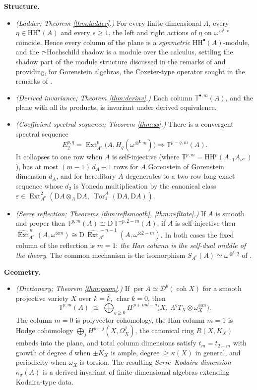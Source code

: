 \documentclass[11pt]{amsart}
\theoremstyle{definition}
\newcommand{\T}{\mathbb{T}}
\newcommand{\HH}{\mathrm{HH}}
\newcommand{\D}{\mathrm{D}}
\newcommand{\Ext}{\operatorname{Ext}}
\newcommand{\Tor}{\operatorname{Tor}}
\newcommand{\sExt}{\widehat{\operatorname{Ext}}}
\newcommand{\Ae}{A^{\mathrm{e}}}
\newcommand{\der}{\mathcal{D}}
\newcommand{\per}{\operatorname{per}}
\newcommand{\Lotimes}{\otimes^{\mathbf{L}}}
\newcommand{\kk}{k}
\begin{document}
\smallskip
\noindent\textbf{Structure.}
\begin{itemize}
\item[(A)] \emph{(Ladder; Theorem \ref{thm:ladder}.)} For every
finite-dimensional $A$, every $\eta\in\HH^\bullet(A)$ and every $s\ge1$, the
left and right actions of $\eta$ on $\omega^{\Lotimes s}$ coincide. Hence
every column of the plane is a \emph{symmetric} $\HH^\bullet(A)$-module, and
the $\tau$-Hochschild shadow is a module over the calculus, settling the
shadow part of the module structure discussed in the remarks of
\cite[\S7.2]{ArmTau} and providing, for Gorenstein algebras, the Coxeter-type
operator sought in the remarks of \cite[\S7.4]{ArmTau}.
\item[(B)] \emph{(Derived invariance; Theorem \ref{thm:derinv}.)} Each column
$\T^{\bullet,m}(A)$, and the plane with all its products, is invariant under
derived equivalence.
\item[(C)] \emph{(Coefficient spectral sequence; Theorem \ref{thm:ss}.)}
There is a convergent spectral sequence
\[
E_2^{p,q}=\Ext^p_{\Ae}\bigl(A,H_q(\omega^{\Lotimes m})\bigr)\Rightarrow
\T^{p-q,m}(A).
\]
It collapses to one row when $A$ is self-injective (where
$\T^{p,m}=\HH^p(A,{}_1A_{\nu^m})$), has at most $(m-1)\,d_A+1$ rows for
$A$ Gorenstein of Gorenstein dimension $d_A$, and for hereditary $A$
degenerates to a two-row long exact sequence whose $d_2$ is Yoneda
multiplication by the canonical class
$\varepsilon\in\Ext^2_{\Ae}(\D A\otimes_A\D A,\ \Tor_1^A(\D A,\D A))$.
\item[(D)] \emph{(Serre reflection; Theorems \ref{thm:reflsmooth},
\ref{thm:refltate}.)} If $A$ is smooth and proper then
$\T^{p,m}(A)\cong\D\,\T^{-p,2-m}(A)$; if $A$ is self-injective then
$\sExt^{\,n}_{\Ae}(A,\omega^{\otimes m})\cong
\D\,\sExt^{\,-n-1}_{\Ae}(A,\omega^{\otimes 2-m})$. In both cases the fixed
column of the reflection is $m=1$: \emph{the Han column is the self-dual
middle of the theory}. The common mechanism is the isomorphism
$S_{\Ae}(A)\simeq\omega^{\Lotimes2}$ of \cite[Theorem 3.2]{ArmTau}.
\end{itemize}

\smallskip
\noindent\textbf{Geometry.}
\begin{itemize}
\item[(E)] \emph{(Dictionary; Theorem \ref{thm:geom}.)} If
$\per A\simeq\der^b(\operatorname{coh}X)$ for a smooth projective variety $X$
over $\kk=\bar\kk$, $\operatorname{char}\kk=0$, then
\[
\T^{p,m}(A)\;\cong\;\bigoplus_{q\ge0}
H^{\,p+md-q}\bigl(X,\ \Lambda^qT_X\otimes\omega_X^{\otimes m}\bigr).
\]
The column $m=0$ is polyvector cohomology, the Han column $m=1$ is Hodge
cohomology $\bigoplus_j H^{p+j}(X,\Omega^j_X)$, the canonical ring
$R(X,K_X)$ embeds into the plane, and total column dimensions satisfy
$t_m=t_{2-m}$ with growth of degree $d$ when $\pm K_X$ is ample, degree
$\ge\kappa(X)$ in general, and periodicity when $\omega_X$ is torsion. The
resulting \emph{Serre--Kodaira dimension} $\kappa_\sigma(A)$ is a derived
invariant of finite-dimensional algebras extending Kodaira-type data.
\end{itemize}
\end{document}
